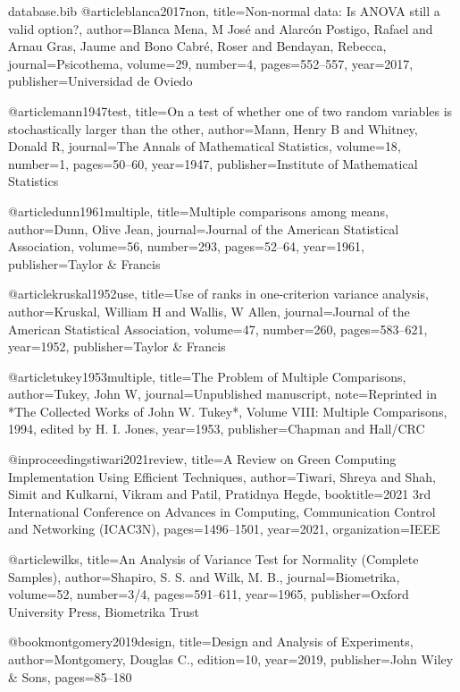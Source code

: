 \begin{filecontents*}{database.bib}
@article{blanca2017non,
  title={Non-normal data: Is ANOVA still a valid option?},
  author={Blanca Mena, M Jos{\'e} and Alarc{\'o}n Postigo, Rafael and Arnau Gras, Jaume and Bono Cabr{\'e}, Roser and Bendayan, Rebecca},
  journal={Psicothema},
  volume={29},
  number={4},
  pages={552--557},
  year={2017},
  publisher={Universidad de Oviedo}
}

@article{mann1947test,
  title={On a test of whether one of two random variables is stochastically larger than the other},
  author={Mann, Henry B and Whitney, Donald R},
  journal={The Annals of Mathematical Statistics},
  volume={18},
  number={1},
  pages={50--60},
  year={1947},
  publisher={Institute of Mathematical Statistics}
}

@article{dunn1961multiple,
  title={Multiple comparisons among means},
  author={Dunn, Olive Jean},
  journal={Journal of the American Statistical Association},
  volume={56},
  number={293},
  pages={52--64},
  year={1961},
  publisher={Taylor \& Francis}
}

@article{kruskal1952use,
  title={Use of ranks in one-criterion variance analysis},
  author={Kruskal, William H and Wallis, W Allen},
  journal={Journal of the American Statistical Association},
  volume={47},
  number={260},
  pages={583--621},
  year={1952},
  publisher={Taylor \& Francis}
}

@article{tukey1953multiple,
  title={The Problem of Multiple Comparisons},
  author={Tukey, John W},
  journal={Unpublished manuscript},
  note={Reprinted in *The Collected Works of John W. Tukey*, Volume VIII: Multiple Comparisons, 1994, edited by H. I. Jones},
  year={1953},
  publisher={Chapman and Hall/CRC}
}

@inproceedings{tiwari2021review,
  title={A Review on Green Computing Implementation Using Efficient Techniques},
  author={Tiwari, Shreya and Shah, Simit and Kulkarni, Vikram and Patil, Pratidnya Hegde},
  booktitle={2021 3rd International Conference on Advances in Computing, Communication Control and Networking (ICAC3N)},
  pages={1496--1501},
  year={2021},
  organization={IEEE}
}

@article{wilks,
  title={An Analysis of Variance Test for Normality (Complete Samples)},
  author={Shapiro, S. S. and Wilk, M. B.},
  journal={Biometrika},
  volume={52},
  number={3/4},
  pages={591--611},
  year={1965},
  publisher={Oxford University Press, Biometrika Trust}
}

@book{montgomery2019design,
  title={Design and Analysis of Experiments},
  author={Montgomery, Douglas C.},
  edition={10},
  year={2019},
  publisher={John Wiley \& Sons},
  pages={85--180}
}


\end{filecontents*}
